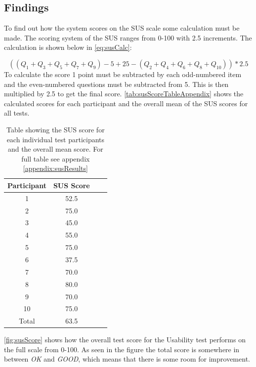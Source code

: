 \subsection{Findings}
To find out how the system scores on the SUS scale some calculation must be made. The scoring system of the SUS ranges from 0-100 with 2.5 increments. The calculation is shown below in \autoref{eq:susCalc}:

\begin{equation} \label{eq:susCalc}
( (Q_1+Q_3+Q_5+Q_7+Q_9)-5+25-(Q_2+Q_4+Q_6+Q_8+Q_{10}) )*2.5
\end{equation}
\linebreak
To calculate the score 1 point must be subtracted by each odd-numbered item and the even-numbered questions must be subtracted from 5. This is then multiplied by 2.5 to get the final score. \autoref{tab:susScoreTableAppendix} shows the calculated scores for each participant and the overall mean of the SUS scores for all tests.

\begin{table}[H]
	\centering
	\caption{Table showing the SUS score for each individual test participants and the overall mean score. For full table see appendix \ref{appendix:susResults}}
	\label{tab:susScoreTableAppendix}
	\begin{tabular}{|c|c|l|l|}
		\hline
		Participant & SUS Score \\ \hline
		1           & 52.5      \\ \hline
		2           & 75.0      \\ \hline
		3           & 45.0      \\ \hline
		4           & 55.0      \\ \hline
		5           & 75.0      \\ \hline
		6           & 37.5      \\ \hline
		7           & 70.0      \\ \hline
		8           & 80.0      \\ \hline
		9           & 70.0      \\ \hline
		10          & 75.0      \\ \hline
		Total       & 63.5      \\ \hline
	\end{tabular}
\end{table}

\autoref{fig:susScore} shows how the overall test score for the Usability test performs on the full scale from 0-100. As seen in the figure the total score is somewhere in between \textit{OK} and \textit{GOOD}, which means that there is some room for improvement.

